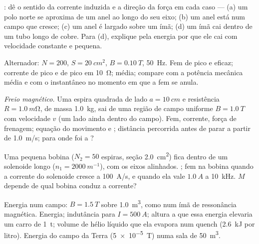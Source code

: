 \begin{exercise}[$\star\star$]\label{exo:b1:induction:5}
: dê o sentido da corrente induzida e a direção da
força em cada caso --- (a) um polo norte se aproxima de um anel ao longo
do seu eixo; (b) um anel está num campo que cresce; (c) um anel é largado
sobre um ímã; (d) um ímã cai dentro de um tubo longo de cobre. Para (d),
explique pela energia por que ele cai com velocidade constante e pequena.
\end{exercise}

\begin{exercise}[$\star\star$]\label{exo:b1:induction:6}
Alternador: $N = 200$, $S = \qty{20}{cm^2}$, $B = \qty{0.10}{T}$, \qty{50}{Hz}.
Fem de pico e eficaz; corrente de pico e  de pico em \qty{10}{\ohm};  média; compare com a potência mecânica média e com o
 instantâneo no momento em que a fem se anula.
\end{exercise}

\begin{exercise}[$\star\star$]\label{exo:b1:induction:7}
\emph{Freio magnético.} Uma espira quadrada de lado $a = \qty{10}{cm}$ e
resistência $R = \qty{1.0}{m\ohm}$, de massa \qty{1.0}{kg}, sai de uma região de
campo uniforme $B = \qty{1.0}{T}$ com velocidade $v$ (um lado ainda dentro do
campo). Fem, corrente, força de frenagem; equação do movimento e ; distância percorrida antes de parar a partir de \qty{1.0}{m/s}; para onde
foi a ?
\end{exercise}

\begin{exercise}[$\star\star$]\label{exo:b1:induction:8}
Uma pequena bobina ($N_2 = 50$ espiras, seção \qty{2.0}{cm^2}) fica dentro de um
solenoide longo ($n_1 = \qty{2000}{m^{-1}}$), com os eixos alinhados. ; fem na bobina quando a corrente do solenoide cresce a
\qty{100}{A/s}, e quando ela vale $\qty{1.0}{A}$ a \qty{10}{kHz}. $M$
depende de qual bobina conduz a corrente?
\end{exercise}

\begin{exercise}[$\star\star$]\label{exo:b1:induction:9}
Energia num campo: $B = \qty{1.5}{T}$ sobre \qty{1.0}{m^3}, como num ímã de
ressonância magnética. Energia; indutância para $I = \qty{500}{A}$; altura a que essa
energia elevaria um carro de \qty{1}{t}; volume de hélio líquido que ela evapora
num quench (\qty{2.6}{kJ} por litro). Energia do campo da Terra
(\qty{5e-5}{T}) numa sala de \qty{50}{m^3}.
\end{exercise}

